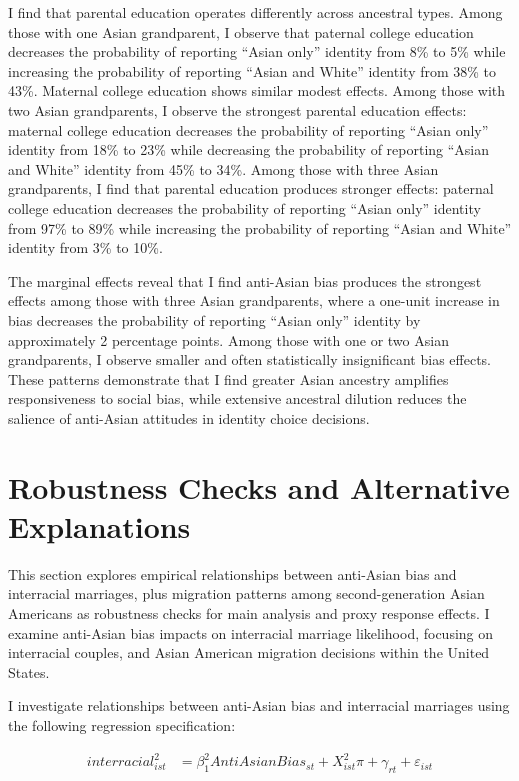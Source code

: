 I find that parental education operates differently across ancestral types. Among those with one Asian grandparent, I observe that paternal college education decreases the probability of reporting ``Asian only'' identity from 8\% to 5\% while increasing the probability of reporting ``Asian and White'' identity from 38\% to 43\%. Maternal college education shows similar modest effects. Among those with two Asian grandparents, I observe the strongest parental education effects: maternal college education decreases the probability of reporting ``Asian only'' identity from 18\% to 23\% while decreasing the probability of reporting ``Asian and White'' identity from 45\% to 34\%. Among those with three Asian grandparents, I find that parental education produces stronger effects: paternal college education decreases the probability of reporting ``Asian only'' identity from 97\% to 89\% while increasing the probability of reporting ``Asian and White'' identity from 3\% to 10\%.

The marginal effects reveal that I find anti-Asian bias produces the strongest effects among those with three Asian grandparents, where a one-unit increase in bias decreases the probability of reporting ``Asian only'' identity by approximately 2 percentage points. Among those with one or two Asian grandparents, I observe smaller and often statistically insignificant bias effects. These patterns demonstrate that I find greater Asian ancestry amplifies responsiveness to social bias, while extensive ancestral dilution reduces the salience of anti-Asian attitudes in identity choice decisions.

\section{Robustness Checks and Alternative Explanations}\label{sec:robcheck}

This section explores empirical relationships between anti-Asian bias and interracial marriages, plus migration patterns among second-generation Asian Americans as robustness checks for main analysis and proxy response effects. I examine anti-Asian bias impacts on interracial marriage likelihood, focusing on interracial couples, and Asian American migration decisions within the United States.

I investigate relationships between anti-Asian bias and interracial marriages using the following regression specification:

\begin{align}
interracial_{ist}^2 &= \beta_1^2 AntiAsianBias_{st} + X_{ist}^2\pi + \gamma_{rt} 
            + \varepsilon_{ist}  \label{eq:inter-interracial} 
\end{align}

